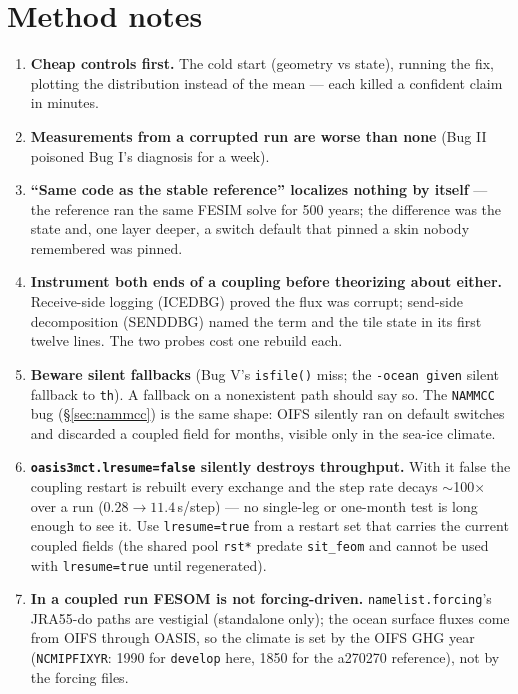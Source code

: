 \documentclass[11pt,a4paper]{article}
\newcommand{\code}[1]{\texttt{\small #1}}
\begin{document}
\section{Method notes}

\begin{enumerate}
\item \textbf{Cheap controls first.} The cold start (geometry vs state), running the fix, plotting
  the distribution instead of the mean --- each killed a confident claim in minutes.
\item \textbf{Measurements from a corrupted run are worse than none} (Bug II poisoned Bug I's
  diagnosis for a week).
\item \textbf{``Same code as the stable reference'' localizes nothing by itself} --- the reference
  ran the same FESIM solve for 500 years; the difference was the state and, one layer deeper, a
  switch default that pinned a skin nobody remembered was pinned.
\item \textbf{Instrument both ends of a coupling before theorizing about either.} Receive-side
  logging (ICEDBG) proved the flux was corrupt; send-side decomposition (SENDDBG) named the term
  and the tile state in its first twelve lines. The two probes cost one rebuild each.
\item \textbf{Beware silent fallbacks} (Bug V's \code{isfile()} miss; the \code{-ocean given}
  silent fallback to \code{th}). A fallback on a nonexistent path should say so. The
  \code{NAMMCC} bug (\S\ref{sec:nammcc}) is the same shape: OIFS silently ran on default switches
  and discarded a coupled field for months, visible only in the sea-ice climate.
\item \textbf{\code{oasis3mct.lresume=false} silently destroys throughput.} With it false the
  coupling restart is rebuilt every exchange and the step rate decays $\sim$100$\times$ over a run
  ($0.28\to11.4$\,s/step) --- no single-leg or one-month test is long enough to see it. Use
  \code{lresume=true} from a restart set that carries the current coupled fields (the shared pool
  \code{rst*} predate \code{sit\_feom} and cannot be used with \code{lresume=true} until
  regenerated).
\item \textbf{In a coupled run FESOM is not forcing-driven.} \code{namelist.forcing}'s JRA55-do
  paths are vestigial (standalone only); the ocean surface fluxes come from OIFS through OASIS, so
  the climate is set by the OIFS GHG year (\code{NCMIPFIXYR}: 1990 for \code{develop} here, 1850
  for the a270270 reference), not by the forcing files.
\end{enumerate}
\end{document}
